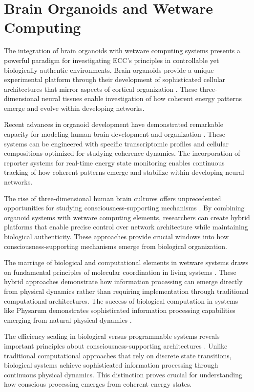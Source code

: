 \section{Brain Organoids and Wetware Computing}

The integration of brain organoids with wetware computing systems presents a powerful paradigm for investigating ECC's principles in controllable yet biologically authentic environments. Brain organoids provide a unique experimental platform through their development of sophisticated cellular architectures that mirror aspects of cortical organization \cite{Lancaster2013}. These three-dimensional neural tissues enable investigation of how coherent energy patterns emerge and evolve within developing networks.

Recent advances in organoid development have demonstrated remarkable capacity for modeling human brain development and organization \cite{Quadrato2017}. These systems can be engineered with specific transcriptomic profiles and cellular compositions optimized for studying coherence dynamics. The incorporation of reporter systems for real-time energy state monitoring enables continuous tracking of how coherent patterns emerge and stabilize within developing neural networks.

The rise of three-dimensional human brain cultures offers unprecedented opportunities for studying consciousness-supporting mechanisms \cite{Pasca2018}. By combining organoid systems with wetware computing elements, researchers can create hybrid platforms that enable precise control over network architecture while maintaining biological authenticity. These approaches provide crucial windows into how consciousness-supporting mechanisms emerge from biological organization.

The marriage of biological and computational elements in wetware systems draws on fundamental principles of molecular coordination in living systems \cite{MacLennan2009}. These hybrid approaches demonstrate how information processing can emerge directly from physical dynamics rather than requiring implementation through traditional computational architectures. The success of biological computation in systems like Physarum demonstrates sophisticated information processing capabilities emerging from natural physical dynamics \cite{Adamatzky2016}.

The efficiency scaling in biological versus programmable systems reveals important principles about consciousness-supporting architectures \cite{Conrad1995}. Unlike traditional computational approaches that rely on discrete state transitions, biological systems achieve sophisticated information processing through continuous physical dynamics. This distinction proves crucial for understanding how conscious processing emerges from coherent energy states.

